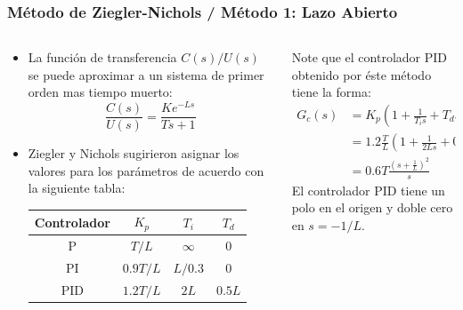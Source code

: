 \documentclass[aspectratio=169,handout]{beamer}
\theoremstyle{definition}
\theoremstyle{plain}
\theoremstyle{remark}
\begin{document}
\begin{frame}[<+->]\frametitle{Método de Ziegler-Nichols / Método 1: Lazo Abierto}
\begin{columns}
\begin{column}{0.5\textwidth}
\small
\begin{itemize}
	\item La función de transferencia $C(s)/U(s)$ se puede aproximar a un sistema de primer orden mas tiempo muerto:
	\begin{equation*}
		\frac{C(s)}{U(s)} = \frac{K e^{-Ls}}{Ts + 1}
	\end{equation*}
	\item Ziegler y Nichols sugirieron asignar los valores para los parámetros de acuerdo con la siguiente tabla:
	\begin{table}
	\begin{tabular}{c|c|c|c}
		Controlador & $K_p$ & $T_i$ & $T_d$\\
		\hline
		P   & $T/L$ & $\infty$ & 0\\
		PI  & $0.9T/L$ & $L/0.3$ & 0\\
		PID & $1.2T/L$ & $2L$ & $0.5L$
	\end{tabular}
	\end{table}
\end{itemize}
\end{column}	
\begin{column}{0.5\textwidth}
Note que el controlador PID obtenido por éste método tiene la forma:
\begin{align*}
	G_c(s) &= K_p\left( 1 + \frac{1}{T_i s} + T_d s \right)\\
	&= 1.2\frac{T}{L}\left( 1 + \frac{1}{2Ls} + 0.5 Ls \right)\\
	&= 0.6T \frac{\left( s + \frac{1}{L} \right)^2}{s}
\end{align*}
El controlador PID tiene un polo en el origen y doble cero en $s = -1/L$.
\end{column}	
\end{columns}
\end{frame}
\end{document}
